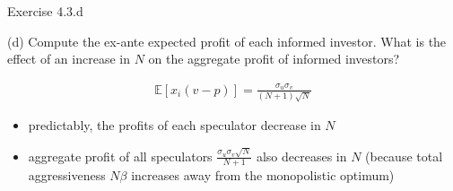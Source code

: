\documentclass[english,10pt
,handout
,aspectratio=169
]{beamer}
\begin{document}
\begin{frame}{Exercise 4.3.d}
	\begin{exampleblock}{}
		(d) Compute the ex-ante expected profit of each informed investor. What is the effect of an increase in $N$ on the aggregate profit of informed investors?
	\end{exampleblock}

	\pause
	
	\begin{align*}
		\mathbb{E} [x_i(v-p)] = \frac{\sigma_u \sigma_v}{(N+1) \sqrt{N}}
	\end{align*}
	\begin{itemize}
		\item predictably, the profits of each speculator decrease in $N$
		\item aggregate profit of all speculators $\frac{\sigma_u \sigma_v \sqrt{N}}{N+1}$ also decreases in $N$ (because total aggressiveness $N \beta$ increases away from the monopolistic optimum)
	\end{itemize}
\end{frame}
\end{document}
